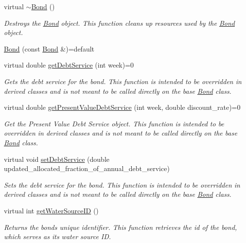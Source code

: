 \begin{DoxyCompactItemize}
virtual \mbox{\hyperlink{classBond_acd301f8d3b4f29e1f797f98d3a2a0b80}{$\sim$\+Bond}} ()
\begin{DoxyCompactList}\small\item\em Destroys the \mbox{\hyperlink{classBond}{Bond}} object. This function cleans up resources used by the \mbox{\hyperlink{classBond}{Bond}} object. \end{DoxyCompactList}\item 
\mbox{\hyperlink{classBond_acaa8874ed5e81057eeb7dc55fb6b5373}{Bond}} (const \mbox{\hyperlink{classBond}{Bond}} \&)=default
\item 
virtual double \mbox{\hyperlink{classBond_a98d8ecaf4b36319674ebd220598996bc}{get\+Debt\+Service}} (int week)=0
\begin{DoxyCompactList}\small\item\em Gets the debt service for the bond. This function is intended to be overridden in derived classes and is not meant to be called directly on the base {\ttfamily \mbox{\hyperlink{classBond}{Bond}}} class. \end{DoxyCompactList}\item 
virtual double \mbox{\hyperlink{classBond_a322d4ab0c0c72824ac4df5df80f14d24}{get\+Present\+Value\+Debt\+Service}} (int week, double discount\+\_\+rate)=0
\begin{DoxyCompactList}\small\item\em Get the Present Value Debt Service object. This function is intended to be overridden in derived classes and is not meant to be called directly on the base {\ttfamily \mbox{\hyperlink{classBond}{Bond}}} class. \end{DoxyCompactList}\item 
virtual void \mbox{\hyperlink{classBond_aff7fc4e1edcf199fb592d22c765b854e}{set\+Debt\+Service}} (double updated\+\_\+allocated\+\_\+fraction\+\_\+of\+\_\+annual\+\_\+debt\+\_\+service)
\begin{DoxyCompactList}\small\item\em Sets the debt service for the bond. This function is intended to be overridden in derived classes and is not meant to be called directly on the base {\ttfamily \mbox{\hyperlink{classBond}{Bond}}} class. \end{DoxyCompactList}\item 
virtual int \mbox{\hyperlink{classBond_a8190ab6482e6a9481afca4840147527e}{get\+Water\+Source\+ID}} ()
\begin{DoxyCompactList}\small\item\em Returns the bond\textquotesingle{}s unique identifier. This function retrieves the {\ttfamily id} of the bond, which serves as its water source ID. \end{DoxyCompactList}\item 

\end{DoxyCompactItemize}
